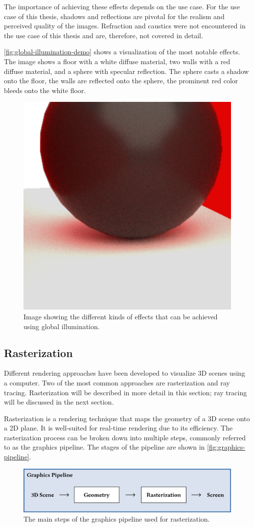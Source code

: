 The importance of achieving these effects depends on the use case. For the use case of this thesis, shadows and reflections are pivotal for the realism and perceived quality of the images. Refraction and caustics were not encountered in the use case of this thesis and are, therefore, not covered in detail.

\autoref{fig:global-illumination-demo} shows a visualization of the most notable effects. The image shows a floor with a white diffuse material, two walls with a red diffuse material, and a sphere with specular reflection. The sphere casts a shadow onto the floor, the walls are reflected onto the sphere, the prominent red color bleeds onto the white floor.

\begin{figure}[H]
  \centering
  \includegraphics[width=0.3\columnwidth]{resources/global-illumination-demonstration.png}
  \caption{Image showing the different kinds of effects that can be achieved using global illumination.}
  \label{fig:global-illumination-demo}
\end{figure}

\subsection{Rasterization}
\label{ch:rasterizationTheory}

Different rendering approaches have been developed to visualize 3D scenes using a computer. Two of the most common approaches are rasterization and ray tracing. Rasterization will be described in more detail in this section; ray tracing will be discussed in the next section.

Rasterization is a rendering technique that maps the geometry of a 3D scene onto a 2D plane. It is well-suited for real-time rendering due to its efficiency. The rasterization process can be broken down into multiple steps, commonly referred to as the graphics pipeline. The stages of the pipeline are shown in \autoref{fig:graphics-pipeline}.

\begin{figure}[H]
  \includegraphics[width=\columnwidth]{resources/graphics-pipeline.png}
  \caption{The main steps of the graphics pipeline used for rasterization.}
  \label{fig:graphics-pipeline}
\end{figure}

